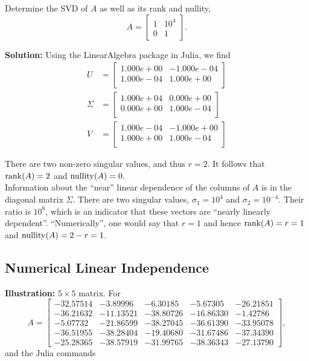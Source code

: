     \begin{example}
\label{ex:SVD01} Determine the SVD of $A$ as well as its rank and nullity,
$$ A=
 \left[ \begin{array}{ll} 1 & 10^4 \\0& 1\end{array} \right].$$

\end{example}

\textbf{Solution:} Using the LinearAlgebra package in Julia, we find
\begin{align*}
    U& =\left[
\begin{array}{cc}
1.000e+00 & -1.000e-04 \\
1.000e-04 & 1.000e+00 \\
\end{array}
\right] \\
\Sigma&= \left[
\begin{array}{cc}
1.000e+04  & 0.000e+00\\
0.000e+00 & 1.000e-04 \\
\end{array}
\right]\\
V&= \left[
\begin{array}{cc}
1.000e-04 & -1.000e+00 \\
1.000e+00 & 1.000e-04 \\
\end{array}
\right]
\end{align*}

There are two non-zero singular values, and thus $r=2$. It follows that $\mathrm{rank}(A)=2$ and $\mathrm{nullity}(A)=0.$\\

Information about the ``near'' linear dependence of the columns of $A$ is in the diagonal matrix $\Sigma$. There are two singular values, $\sigma_1=10^4$ and $\sigma_2 = 10^{-4}$. Their ratio is $10^8$, which is an indicator that these vectors are ``nearly linearly dependent''. ``Numerically'', one would say that $r=1$ and hence $\mathrm{rank}(A) =r=1$ and $\mathrm{nullity}(A)=2-r=1$.
\Qed

    
\subsection{Numerical Linear Independence}

\textbf{Illustration:}  $5 \times 5$ matrix. For
$$A=\left[ \begin{array}{rrrrr}-32.57514& -3.89996& -6.30185& -5.67305& -26.21851\\-36.21632& -11.13521& -38.80726& -16.86330& -1.42786\\-5.07732& -21.86599& -38.27045& -36.61390& -33.95078\\-36.51955& -38.28404& -19.40680& -31.67486& -37.34390\\-25.28365& -38.57919& -31.99765& -38.36343& -27.13790\end{array}
 \right], $$
 and the Julia commands
 
